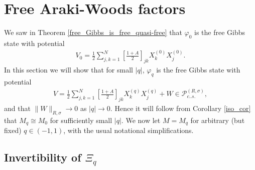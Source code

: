 
%
%

\chapter{Free Araki-Woods factors}\label{application}

We saw in Theorem \ref{free_Gibbs_is_free_quasi-free} that $\varphi_0$ is the free Gibbs state with potential
	\begin{align*}
		V_0=\frac{1}{2}\sum_{j,k=1}^N \left[\frac{1+A}{2}\right]_{jk}X_k^{(0)}X_j^{(0)}.
	\end{align*}
In this section we will show that for small $|q|$, $\varphi_q$ is the free Gibbs state with potential 
	\begin{align*}
		V=\frac{1}{2}\sum_{j,k=1}^N \left[\frac{1+A}{2}\right]_{jk}X_k^{(q)}X_j^{(q)}+W\in\mathscr{P}_{c..s.}^{(R,\sigma)},
	\end{align*}
and that $\|W\|_{R,\sigma}\rightarrow 0 $ as $|q|\rightarrow 0$. Hence it will follow from Corollary \ref{iso_cor} that $M_q\cong M_0$ for sufficiently small $|q|$. We now let $M=M_q$ for arbitrary (but fixed) $q\in (-1,1)$, with the usual notational simplifications.


\section{Invertibility of $\Xi_q$}


